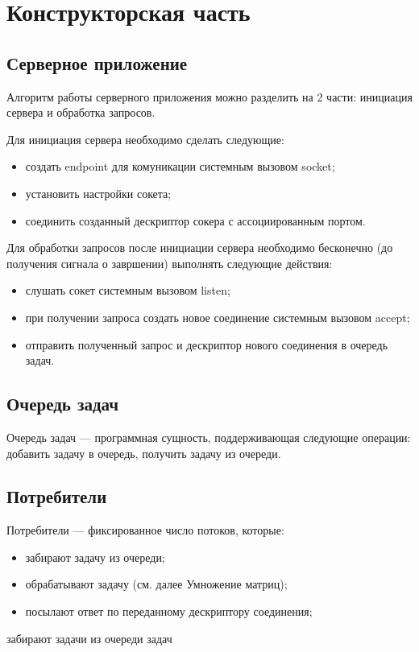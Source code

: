 \chapter{Конструкторская часть}

\section{Серверное приложение}

Алгоритм работы серверного приложения можно разделить на 2 части: инициация сервера и обработка запросов.

Для инициация сервера необходимо сделать следующие:

\begin{itemize}
	\item создать endpoint для комуникации системным вызовом socket;
	\item установить настройки сокета;
	\item соединить созданный дескриптор сокера с ассоциированным портом.
\end{itemize}

Для обработки запросов после инициации сервера необходимо бесконечно (до получения сигнала о завршении) выполнять следующие действия:

\begin{itemize}
	\item слушать сокет системным вызовом listen;
	\item при получении запроса создать новое соединение системным вызовом accept;
	\item отправить полученный запрос и дескриптор нового соединения в очередь задач.
\end{itemize}

\section{Очередь задач}

Очередь задач — программная сущность, поддерживающая следующие операции: добавить задачу в очередь, получить задачу из очереди.

\section{Потребители}

Потребители — фиксированное число потоков, которые:
\begin{itemize}
	\item забирают задачу из очереди;
	\item обрабатывают задачу (см. далее Умножение матриц);
	\item посылают ответ по переданному дескриптору соединения;
\end{itemize}
 забирают задачи из очереди задач

